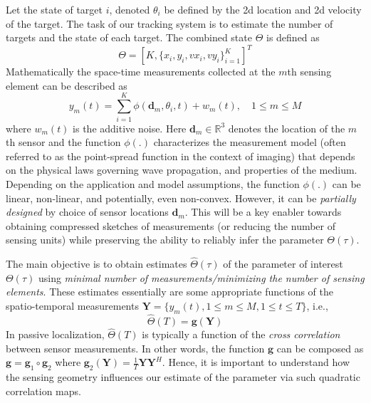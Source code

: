 Let the state of target $i$, denoted $\theta_i$ be defined by the 2d location and 2d velocity of the target. The task of our tracking system is to estimate the number of targets and the state of each target.
The combined state $\Theta$ is defined as 
\begin{equation} \Theta = [K, \{x_i, y_i, vx_i ,vy_i\}_{i=1}^K]^T 
\end{equation} 
Mathematically the space-time measurements collected at the $m$th sensing element can be described as 
\begin{equation} 
y_m (t) = \sum_{i=1}^{K} \phi (\mathbf{d}_m,\theta_i,t) + w_m(t), \quad 1\leq m\leq M
\end{equation}
where $w_m(t)$ is the additive noise. Here $\mathbf{d}_m\in \mathbb{R}^3$ denotes the location of the $m$th sensor and the function $\phi(.)$ characterizes the measurement model (often referred to as the point-spread function in the context of imaging) that depends on the physical laws governing wave propagation, and properties of the medium. Depending on the application and model assumptions, the function $\phi(.)$ can be linear, non-linear, and potentially, even non-convex. However, it can be {\em partially designed} by choice of sensor locations $\mathbf{d}_m$. This will be a key enabler towards obtaining compressed sketches of measurements (or reducing the number of sensing units) while preserving the ability to reliably infer the parameter $\Theta(\tau)$.\\



The main objective is to obtain estimates $\hat\Theta(\tau)$ of the parameter of interest $\Theta (\tau)$ using {\em minimal number of measurements/minimizing the number of sensing elements}. These estimates essentially are some appropriate functions of the spatio-temporal measurements $\mathbf{Y} = \{y_m(t),  1\leq m\leq M, 1\leq t\leq T \}$, i.e., 
\begin{equation}
\hat{\Theta}(T) = \mathbf{g} (\mathbf{Y}) 
\end{equation} 
In passive localization, $\hat{\Theta}(T)$ is typically a function of the {\em cross correlation} between sensor measurements. In other words, the function $\mathbf{g}$ can be composed as $\mathbf{g}=\mathbf{g}_1 \circ \mathbf{g}_2$ where $\mathbf{g}_2(\mathbf{Y})=\frac{1}{T}\mathbf{YY}^{H}$. Hence, it is important to understand how the sensing geometry influences our estimate of the parameter via such quadratic correlation maps.


